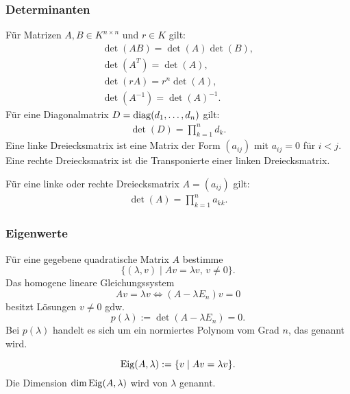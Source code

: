 \subsubsection{Determinanten}
Für Matrizen $A,B\in K^{n\times n}$ und $r\in K$ gilt:
\begin{gather}
\det(AB) = \det(A)\det(B),\\
\det(A^T) = \det(A),\\
\det(rA) = r^n\det(A),\\
\det(A^{-1}) = \det(A)^{-1}.
\end{gather}
Für eine Diagonalmatrix $D=\operatorname*{diag}(d_1,\ldots,d_n)$ gilt:
\begin{gather}
\det(D) = \prod_{k=1}^n d_k.
\end{gather}
Eine linke Dreiecksmatrix ist eine Matrix der Form
$(a_{ij})$ mit $a_{ij}=0$ für $i<j$. Eine rechte
Dreiecksmatrix ist die Transponierte einer linken
Dreiecksmatrix.

Für eine linke oder rechte Dreiecksmatrix $A=(a_{ij})$ gilt:
\begin{gather}
\det(A) = \prod_{k=1}^n a_{kk}.
\end{gather}

\subsubsection{Eigenwerte}
Für eine gegebene quadratische Matrix $A$ bestimme
\begin{equation}
\{(\lambda,v)\mid Av = \lambda v,\,v\ne 0\}.
\end{equation}
Das homogene lineare Gleichungssystem
\begin{equation}
Av=\lambda v \iff (A-\lambda E_n)v=0
\end{equation}
besitzt Lösungen $v\ne 0$ gdw.
\begin{equation}
p(\lambda):=\det(A-\lambda E_n)=0.
\end{equation}
Bei $p(\lambda)$ handelt es sich um ein normiertes Polynom
vom Grad $n$, das 
genannt wird.

\begin{equation}
\operatorname*{Eig}(A,\lambda):=\{v\mid Av=\lambda v\}.
\end{equation}
Die Dimension $\dim\operatorname*{Eig}(A,\lambda)$ wird
von $\lambda$ genannt.

